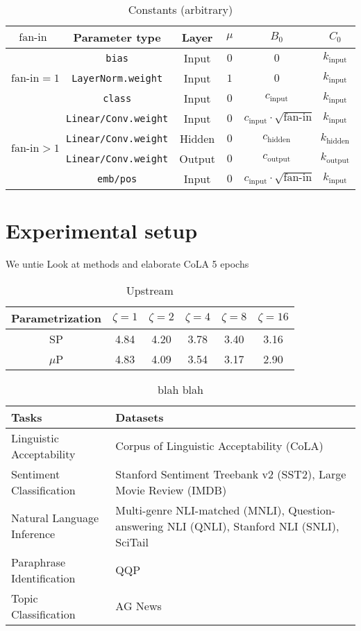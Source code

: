 \documentclass{article}
\newcommand{\mup}{$\mu$P}
\newcommand{\fanin}{\text{fan-in}}
\newcommand{\cinput}{c_{\text{input}}}
\newcommand{\chidden}{c_{\text{hidden}}}
\newcommand{\coutput}{c_{\text{output}}}
\newcommand{\kinput}{k_{\text{input}}}
\newcommand{\khidden}{k_{\text{hidden}}}
\newcommand{\koutput}{k_{\text{output}}}
\begin{document}
\begin{table}[h!]
\Centering
\begin{tabular}{cccccc}
\toprule
    $\fanin$ & Parameter type & Layer & $\mu$ & $B_0$ & $C_0$\\
\midrule
\multirow{3}{*}{$\fanin=1$} & \texttt{bias} & Input & $0$ & $0$ & $\kinput$\\
& \texttt{LayerNorm.weight} & Input & $1$ & $0$ & $\kinput$\\
& \texttt{class} & Input & $0$ & $\cinput$ & $\kinput$\\
\cmidrule{1-6}
\multirow{4}{*}{$\fanin>1$} & \texttt{Linear/Conv.weight}  & Input & $0$ & $\cinput \cdot \sqrt{\fanin}$ & $\kinput$\\
& \texttt{Linear/Conv.weight}  & Hidden & $0$ & $\chidden$ & $\khidden$\\
& \texttt{Linear/Conv.weight}  & Output & $0$ & $\coutput$ & $\koutput$\\
\cmidrule{2-6}
& \texttt{emb/pos} & Input & $0$ & $\cinput \cdot \sqrt{\fanin}$ & $\kinput$\\
\bottomrule
\end{tabular}
\caption{Constants (arbitrary)}
\end{table}


\section{Experimental setup}
We untie
Look at methods and elaborate
CoLA 5 epochs

\begin{table}[h!]
\Centering
\begin{tabular}{cccccc}
\toprule
Parametrization & $\zeta=1$ & $\zeta=2$ & $\zeta=4$ & $\zeta=8$ & $\zeta=16$\\
\midrule
SP & 4.84 & 4.20 & 3.78 & 3.40 & 3.16\\
\mup & 4.83 & 4.09 & 3.54 & 3.17 & 2.90\\
\bottomrule
\end{tabular}
\caption{Upstream}
\end{table}

\begin{table}[h!]
\Centering
\begin{tabular}{lp{20em}}
\toprule
\textbf{Tasks} & \textbf{Datasets} \\
\midrule
Linguistic Acceptability & Corpus of Linguistic Acceptability (CoLA) \\
Sentiment Classification & Stanford Sentiment Treebank v2 (SST2), Large Movie Review (IMDB) \\
Natural Language Inference & Multi-genre NLI-matched (MNLI), Question-answering NLI (QNLI), Stanford NLI (SNLI), SciTail \\
Paraphrase Identification & QQP \\
Topic Classification & AG News \\
\bottomrule
\end{tabular}
\caption{blah blah}
\end{table}
\end{document}
